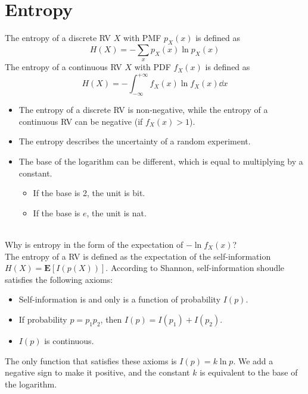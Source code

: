 \documentclass[device=normal, lang=en]{elegantbook}
\numberwithin{equation}{section}
\begin{document}
\section{Entropy}
\begin{definition}[Entropy]
    The entropy of a discrete RV $X$ with PMF $p_X(x)$ is defined as
    \begin{equation}
        H(X) = -\sum_{x} p_X(x) \ln p_X(x)
    \end{equation}
    The entropy of a continuous RV $X$ with PDF $f_X(x)$ is defined as
    \begin{equation}
        H(X) = -\int_{-\infty}^{+\infty} f_X(x) \ln f_X(x) \dd{x}
    \end{equation}
\end{definition}
\begin{remark}
    \begin{itemize}
        \item The entropy of a discrete RV is non-negative, while the entropy of a continuous RV can be negative (if $f_{X}(x) > 1$).
        \item The entropy describes the uncertainty of a random experiment.
        \item The base of the logarithm can be different, which is equal to multiplying by a constant. \begin{itemize}
            \item If the base is 2, the unit is bit.
            \item If the base is $e$, the unit is nat.
        \end{itemize}
    \end{itemize}
\end{remark}
\begin{remark} \\ 
    Why is entropy in the form of the expectation of $-\ln f_{X}(x)$? \\ 
    The entropy of a RV is defined as the expectation of the self-information $H(X) = \mathbf{E}[I(p(X))]$. According to Shannon, self-information shoudle satisfies the following axioms:
    \begin{itemize}
        \item Self-information is and only is a function of probability $I(p)$.
        \item If probability $p = p_1 p_2$, then $I(p) = I(p_1) + I(p_2)$.
        \item $I(p)$ is continuous.
    \end{itemize}
    The only function that satisfies these axioms is $I(p) = k \ln p$. We add a negative sign to make it positive, and the constant $k$ is equivalent to the base of the logarithm. 
\end{remark}
\end{document}
